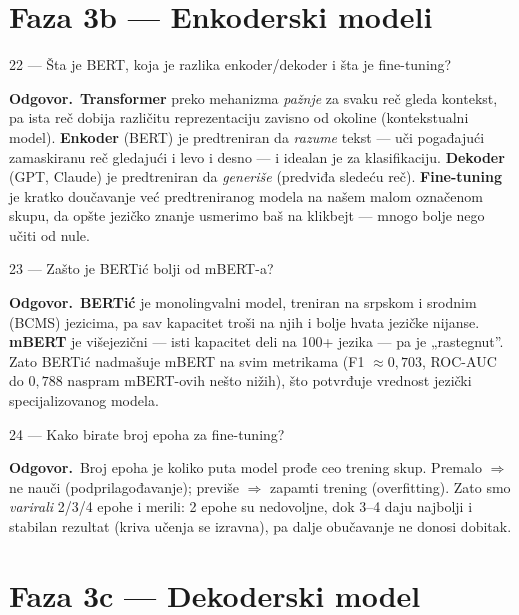 \documentclass[11pt,a4paper]{article}
\newcommand{\odg}{\smallskip\noindent\textbf{Odgovor.}\ }
\begin{document}
\section{Faza 3b --- Enkoderski modeli}

\begin{pitanje}{22 --- Šta je BERT, koja je razlika enkoder/dekoder i šta je fine-tuning?}
\end{pitanje}
\odg \textbf{Transformer} preko mehanizma \emph{pažnje} za svaku reč gleda kontekst, pa
ista reč dobija različitu reprezentaciju zavisno od okoline (kontekstualni model).
\textbf{Enkoder} (BERT) je predtreniran da \emph{razume} tekst --- uči pogađajući
zamaskiranu reč gledajući i levo i desno --- i idealan je za klasifikaciju.
\textbf{Dekoder} (GPT, Claude) je predtreniran da \emph{generiše} (predviđa sledeću
reč). \textbf{Fine-tuning} je kratko doučavanje već predtreniranog modela na našem
malom označenom skupu, da opšte jezičko znanje usmerimo baš na klikbejt --- mnogo bolje
nego učiti od nule.

\begin{pitanje}{23 --- Zašto je BERTić bolji od mBERT-a?}
\end{pitanje}
\odg \textbf{BERTić} je monolingvalni model, treniran na srpskom i srodnim (BCMS)
jezicima, pa sav kapacitet troši na njih i bolje hvata jezičke nijanse. \textbf{mBERT}
je višejezični --- isti kapacitet deli na 100+ jezika --- pa je „rastegnut''. Zato
BERTić nadmašuje mBERT na svim metrikama (F1 $\approx 0{,}703$, ROC-AUC do
$0{,}788$ naspram mBERT-ovih nešto nižih), što potvrđuje vrednost jezički
specijalizovanog modela.

\begin{pitanje}{24 --- Kako birate broj epoha za fine-tuning?}
\end{pitanje}
\odg Broj epoha je koliko puta model prođe ceo trening skup. Premalo $\Rightarrow$ ne
nauči (podprilagođavanje); previše $\Rightarrow$ zapamti trening (overfitting). Zato
smo \emph{varirali} 2/3/4 epohe i merili: 2 epohe su nedovoljne, dok 3--4 daju najbolji
i stabilan rezultat (kriva učenja se izravna), pa dalje obučavanje ne donosi dobitak.

\section{Faza 3c --- Dekoderski model}
\end{document}
